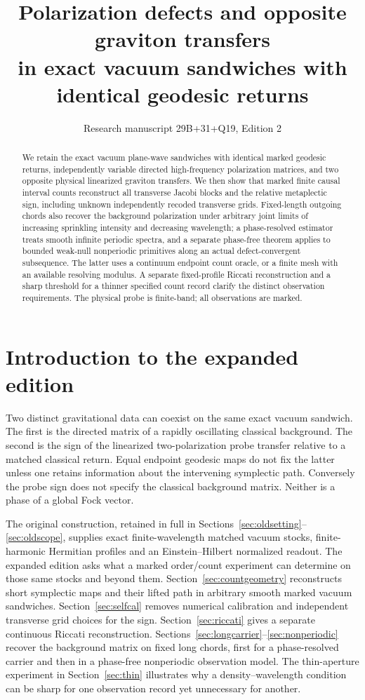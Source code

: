 \documentclass[11pt]{article}
\title{Polarization defects and opposite graviton transfers\\ in exact vacuum sandwiches with identical geodesic returns}
\author{}
\date{Research manuscript 29B+31+Q19, Edition 2}
\begin{document}
\maketitle
\begin{abstract}
We retain the exact vacuum plane-wave sandwiches with identical
marked geodesic returns, independently variable directed
high-frequency polarization matrices, and two opposite physical
linearized graviton transfers. We then show that marked finite
causal interval counts reconstruct all transverse Jacobi blocks
and the relative metaplectic sign, including unknown independently
recoded transverse grids. Fixed-length outgoing chords also
recover the background polarization under arbitrary joint limits
of increasing sprinkling intensity and decreasing wavelength;
a phase-resolved estimator treats smooth infinite periodic
spectra, and a separate phase-free theorem applies to bounded
weak-null nonperiodic primitives along an actual
defect-convergent subsequence. The latter uses a continuum
endpoint count oracle, or a finite mesh with an available
resolving modulus. A separate fixed-profile Riccati reconstruction
and a sharp threshold for a thinner specified count record
clarify the distinct observation requirements. The physical
probe is finite-band; all observations are marked.
\end{abstract}

\section{Introduction to the expanded edition}
\label{sec:intro2}
Two distinct gravitational data can coexist on the same exact
vacuum sandwich. The first is the directed matrix of a rapidly
oscillating classical background. The second is the sign of the
linearized two-polarization probe transfer relative to a matched
classical return. Equal endpoint geodesic maps do not fix the latter
unless one retains information about the intervening symplectic path.
Conversely the probe sign does not specify the classical background
matrix. Neither is a phase of a global Fock vector.

The original construction, retained in full in
Sections~\ref{sec:oldsetting}--\ref{sec:oldscope}, supplies exact
finite-wavelength matched vacuum stocks, finite-harmonic Hermitian
profiles and an Einstein--Hilbert normalized readout. The expanded
edition asks what a marked order/count experiment can determine on
those same stocks and beyond them. Section~\ref{sec:countgeometry}
reconstructs short symplectic maps and their lifted path in arbitrary
smooth marked vacuum sandwiches. Section~\ref{sec:selfcal} removes
numerical calibration and independent transverse grid choices for
the sign. Section~\ref{sec:riccati} gives a separate continuous
Riccati reconstruction. Sections~\ref{sec:longcarrier}--\ref{sec:nonperiodic}
recover the background matrix on fixed long chords, first for a
phase-resolved carrier and then in a phase-free nonperiodic
observation model. The thin-aperture experiment in
Section~\ref{sec:thin} illustrates why a density--wavelength condition
can be sharp for one observation record yet unnecessary for another.
\end{document}
